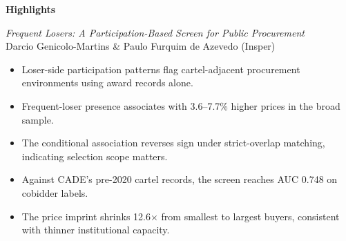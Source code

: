 \documentclass[12pt]{article}
\begin{document}
\noindent\textbf{Highlights}

\bigskip

\noindent\emph{Frequent Losers: A Participation-Based Screen for Public Procurement}\\
Darcio Genicolo-Martins \& Paulo Furquim de Azevedo (Insper)

\bigskip

\begin{itemize}[leftmargin=1.5em,itemsep=4pt]
  \item Loser-side participation patterns flag cartel-adjacent procurement environments using award records alone.
  \item Frequent-loser presence associates with 3.6--7.7\% higher prices in the broad sample.
  \item The conditional association reverses sign under strict-overlap matching, indicating selection scope matters.
  \item Against CADE's pre-2020 cartel records, the screen reaches AUC 0.748 on cobidder labels.
  \item The price imprint shrinks 12.6$\times$ from smallest to largest buyers, consistent with thinner institutional capacity.
\end{itemize}
\end{document}
